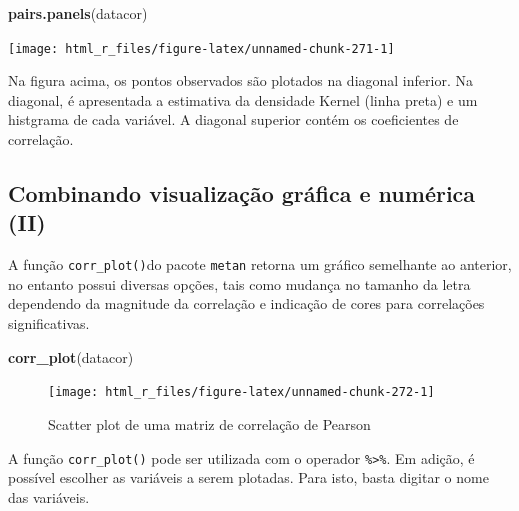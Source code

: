 \documentclass[
]{book}
\newenvironment{Shaded}{\begin{snugshade}}{\end{snugshade}}
\newcommand{\KeywordTok}[1]{\textcolor[rgb]{0.13,0.29,0.53}{\textbf{#1}}}
\newcommand{\NormalTok}[1]{#1}
\begin{document}

\begin{Shaded}
\begin{Highlighting}[]

\KeywordTok{pairs.panels}\NormalTok{(datacor)}
\end{Highlighting}
\end{Shaded}

\begin{center}\texttt{[image: html\_r\_files/figure-latex/unnamed-chunk-271-1]} \end{center}

Na figura acima, os pontos observados são plotados na diagonal inferior. Na diagonal, é apresentada a estimativa da densidade Kernel (linha preta) e um histgrama de cada variável. A diagonal superior contém os coeficientes de correlação.

\hypertarget{combinando-visualizauxe7uxe3o-gruxe1fica-e-numuxe9rica-ii}{%
\subsection{Combinando visualização gráfica e numérica (II)}\label{combinando-visualizauxe7uxe3o-gruxe1fica-e-numuxe9rica-ii}}


A função \texttt{corr\_plot()}do pacote \texttt{metan} retorna um gráfico semelhante ao anterior, no entanto possui diversas opções, tais como mudança no tamanho da letra dependendo da magnitude da correlação e indicação de cores para correlações significativas.

\begin{Shaded}
\begin{Highlighting}[]
\KeywordTok{corr_plot}\NormalTok{(datacor)}
\end{Highlighting}
\end{Shaded}

\begin{figure}

{\centering \texttt{[image: html\_r\_files/figure-latex/unnamed-chunk-272-1]} 

}

\caption{Scatter plot de uma matriz de correlação de Pearson}\label{fig:unnamed-chunk-272}
\end{figure}

A função \texttt{corr\_plot()} pode ser utilizada com o operador \texttt{\%\textgreater{}\%}. Em adição, é possível escolher as variáveis a serem plotadas. Para isto, basta digitar o nome das variáveis.
\end{document}
